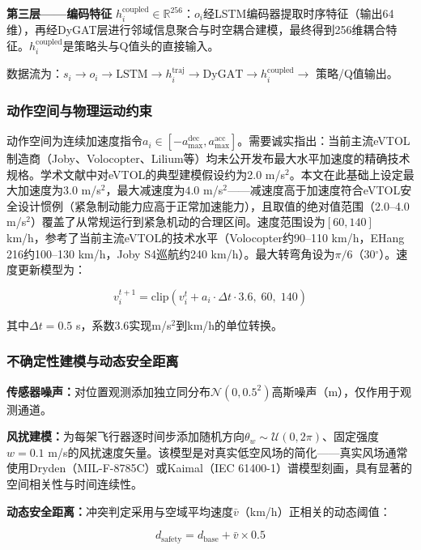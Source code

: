 \documentclass[12pt,a4paper,UTF8]{ctexart}
\begin{document}
\textbf{第三层——编码特征} $h_i^{\text{coupled}} \in \mathbb{R}^{256}$：$o_i$经LSTM编码器提取时序特征（输出64维），再经DyGAT层进行邻域信息聚合与时空耦合建模，最终得到256维耦合特征。$h_i^{\text{coupled}}$是策略头与Q值头的直接输入。

数据流为：$s_i \to o_i \to \text{LSTM} \to h_i^{\text{traj}} \to \text{DyGAT} \to h_i^{\text{coupled}} \to$ 策略/Q值输出。

\subsubsection{动作空间与物理运动约束}

动作空间为连续加速度指令$a_i \in [-a_{\max}^{\text{dec}}, a_{\max}^{\text{acc}}]$。需要诚实指出：当前主流eVTOL制造商（Joby、Volocopter、Lilium等）均未公开发布最大水平加速度的精确技术规格。学术文献中对eVTOL的典型建模假设约为2.0 m/s$^2$\cite{ref25}。本文在此基础上设定最大加速度为$3.0$ m/s$^2$，最大减速度为$4.0$ m/s$^2$——减速度高于加速度符合eVTOL安全设计惯例（紧急制动能力应高于正常加速能力），且取值的绝对值范围（2.0--4.0 m/s$^2$）覆盖了从常规运行到紧急机动的合理区间。速度范围设为$[60, 140]$ km/h，参考了当前主流eVTOL的技术水平（Volocopter约90--110 km/h，EHang 216约100--130 km/h，Joby S4巡航约240 km/h）。最大转弯角设为$\pi/6$（30$^\circ$）。速度更新模型为：

\begin{equation}
    v_i^{t+1} = \text{clip}\left(v_i^{t} + a_i \cdot \Delta t \cdot 3.6,\; 60,\; 140\right)
\end{equation}

其中$\Delta t = 0.5$ s，系数3.6实现m/s$^2$到km/h的单位转换。

\subsubsection{不确定性建模与动态安全距离}

\textbf{传感器噪声：}对位置观测添加独立同分布$\mathcal{N}(0, 0.5^2)$高斯噪声（m），仅作用于观测通道。

\textbf{风扰建模：}为每架飞行器逐时间步添加随机方向$\theta_w \sim \mathcal{U}(0, 2\pi)$、固定强度$w = 0.1$ m/s的风扰速度矢量。该模型是对真实低空风场的简化——真实风场通常使用Dryden（MIL-F-8785C）\cite{ref26}或Kaimal（IEC 61400-1）谱模型刻画，具有显著的空间相关性与时间连续性。

\textbf{动态安全距离：}冲突判定采用与空域平均速度$\bar{v}$（km/h）正相关的动态阈值：

\begin{equation}
    d_{\text{safety}} = d_{\text{base}} + \bar{v} \times 0.5
\end{equation}
\end{document}
